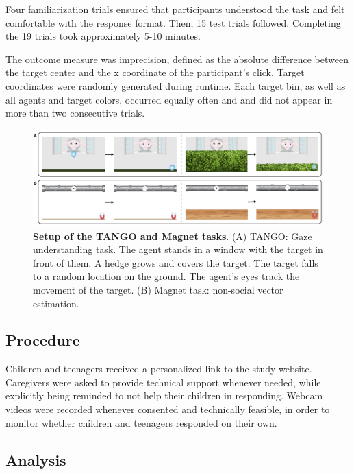 \documentclass[
  man,floatsintext]{apa6}
\begin{document}
Four familiarization trials ensured that participants understood the task and felt comfortable with the response format.
Then, 15 test trials followed.
Completing the 19 trials took approximately 5-10 minutes.

The outcome measure was imprecision, defined as the absolute difference between the target center and the x coordinate of the participant's click.
Target coordinates were randomly generated during runtime.
Each target bin, as well as all agents and target colors, occurred equally often and and did not appear in more than two consecutive trials.



\begin{figure}

{\centering \includegraphics[width=1\linewidth]{../figures/procedure} 

}

\caption{\textbf{Setup of the TANGO and Magnet tasks}. (A) TANGO: Gaze understanding task. The agent stands in a window with the target in front of them. A hedge grows and covers the target. The target falls to a random location on the ground. The agent's eyes track the movement of the target. (B) Magnet task: non-social vector estimation.}\label{fig:fig1}
\end{figure}

\hypertarget{procedure}{%
\subsection{Procedure}\label{procedure}}

Children and teenagers received a personalized link to the study website.
Caregivers were asked to provide technical support whenever needed, while explicitly being reminded to not help their children in responding.
Webcam videos were recorded whenever consented and technically feasible, in order to monitor whether children and teenagers responded on their own.

\hypertarget{analysis}{%
\subsection{Analysis}\label{analysis}}
\end{document}
